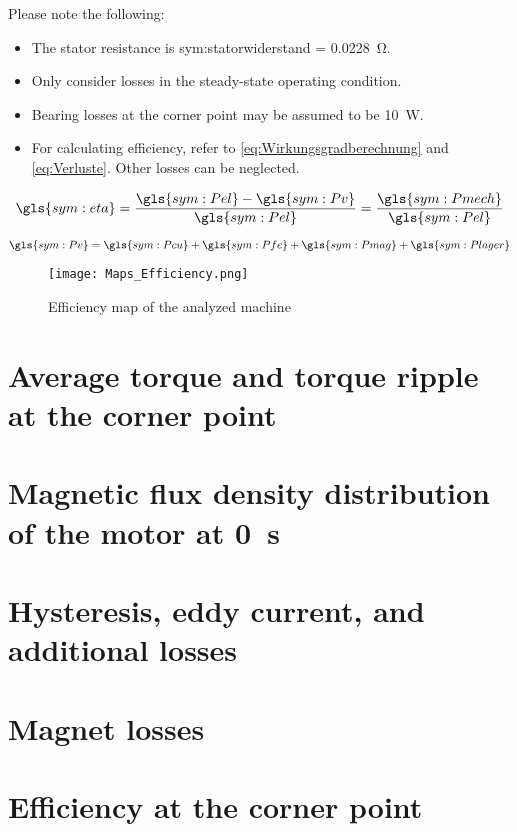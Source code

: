 \newpage

Please note the following:
\begin{itemize}
\item The stator resistance is \gls{sym:statorwiderstand} = \SI{0.0228}{\ohm}.
\item Only consider losses in the steady-state operating condition.
\item Bearing losses at the corner point may be assumed to be \SI{10}{\watt}.
\item For calculating efficiency, refer to \autoref{eq:Wirkungsgradberechnung} and \autoref{eq:Verluste}. Other losses can be neglected.
\end{itemize}

\begin{equation}
	\gls{sym:eta}=\frac{\gls{sym:Pel}-\gls{sym:Pv}}{\gls{sym:Pel}} = \frac{\gls{sym:Pmech}}{\gls{sym:Pel}}
\end{equation}

\begin{equation}
	\gls{sym:Pv}=\gls{sym:Pcu}+\gls{sym:Pfe}+\gls{sym:Pmag}+\gls{sym:Plager}
\end{equation}

\begin{figure}[htb]
	\centering
	\texttt{[image: Maps\_Efficiency.png]}
	\caption{Efficiency map of the analyzed machine}
	\label{abb:Maps1}
\end{figure}

\newpage

\section{Average torque and torque ripple at the corner point}

\section{Magnetic flux density distribution of the motor at \SI{0}{\second}}

\section{Hysteresis, eddy current, and additional losses}

\section{Magnet losses}

\section{Efficiency at the corner point}

\newpage